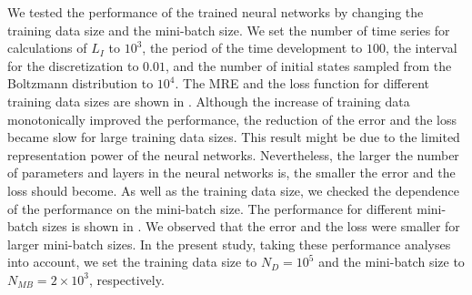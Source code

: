 We tested the performance of the trained neural networks by changing the training data size and the mini-batch size.
We set the number of time series for calculations of $L_I$ to $10^3$,
the period of the time development to $100$, the interval for the discretization to $0.01$,
and the number of initial states sampled from the Boltzmann distribution to $10^4$.
The MRE and the loss function for different training data sizes are shown in .
Although the increase of training data monotonically improved the performance, the reduction of the error and the loss became slow for large training data sizes.
This result might be due to the limited representation power of the neural networks.
Nevertheless, the larger the number of parameters and layers in the neural networks is, the smaller the error and the loss should become.
As well as the training data size, we checked the dependence of the performance on the mini-batch size.
The performance for different mini-batch sizes is shown in .
We observed that the error and the loss were smaller for larger mini-batch sizes.
In the present study, taking these performance analyses into account, we set the training data size to $N_D=10^5$ and the mini-batch size to $N_{MB}=2 \times 10^3$, respectively.

